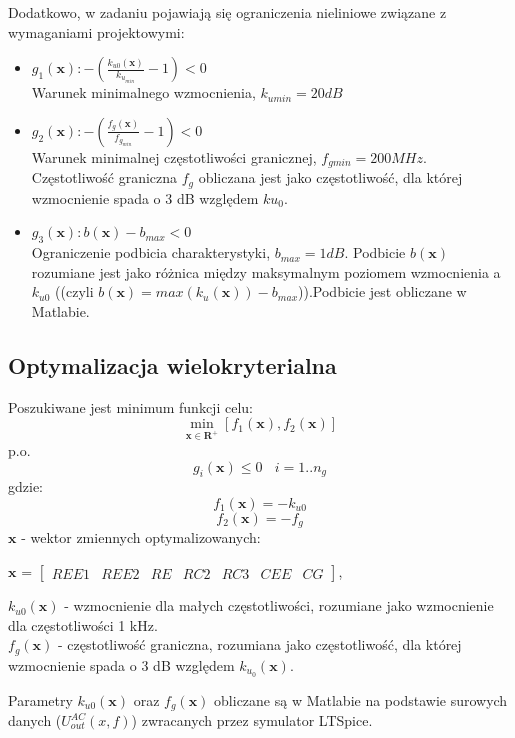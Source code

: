 \documentclass{article}
\begin{document}
Dodatkowo, w zadaniu pojawiają się ograniczenia nieliniowe związane z wymaganiami projektowymi:\\
\begin{itemize}
	\item \(g_1(\textbf{x}): -(\frac{k_{u0}(\textbf{x})}{k_{u_{min}}}-1) <  0\) \\ Warunek minimalnego wzmocnienia, $k_{umin}=20dB$
	\item \(g_2(\textbf{x}): -(\frac{{f_g}(\textbf{x})}{f_{g_{min}}}-1)<0\) \\ Warunek minimalnej częstotliwości granicznej, $f_{gmin}=200 MHz$. Częstotliwość graniczna $f_g$ obliczana jest jako częstotliwość,
dla której wzmocnienie spada o 3 dB względem $ku_0$.
	\item \(g_3(\textbf{x}): b(\textbf{x})-b_{max}<0\) \\ Ograniczenie podbicia charakterystyki, $b_{max}=1dB$. Podbicie $b(\textbf{x})$ rozumiane jest jako różnica między maksymalnym poziomem wzmocnienia a $k_{u0}$ ((czyli $b(\textbf{x})=max(k_{u}(\textbf{x}))-b_{max}$)).Podbicie jest obliczane w Matlabie.

\end{itemize}
\subsection{Optymalizacja wielokryterialna}
Poszukiwane jest minimum funkcji celu:
\[ \min\limits_{\textbf{x}\in \mathbf{R}^+  } [f_1(\textbf{x}), f_2(\textbf{x})] \]
p.o.
\[ g_{i}(\textbf{x}) \leq 0 \ \ \ \  i=1..n_g\]
gdzie:
\[ f_1(\textbf{x}) = -k_{u0}\] \[ f_2(\textbf{x}) = -f_g\]
\(\textbf{x}\) - wektor zmiennych optymalizowanych: \\
\begin{center}
	$\textbf{x}$ =
	$\begin{bmatrix}
			REE1 & REE2 & RE & RC2 & RC3 & CEE & CG
		\end{bmatrix}$,
\end{center}
\(k_{u0}(\textbf{x})\) - wzmocnienie dla małych częstotliwości, rozumiane jako wzmocnienie dla częstotliwości 1 kHz.\\
\(f_{g}(\textbf{x})\) - częstotliwość graniczna, rozumiana jako częstotliwość, dla której wzmocnienie
spada o 3 dB względem $k_{u_{0}}(\textbf{x}) $.

Parametry $k_{u0}(\textbf{x})$ oraz $f_g(\textbf{x})$ obliczane są w Matlabie na podstawie surowych danych ($U^{AC}_{out}(x,f)$) zwracanych
przez symulator LTSpice.
\end{document}
